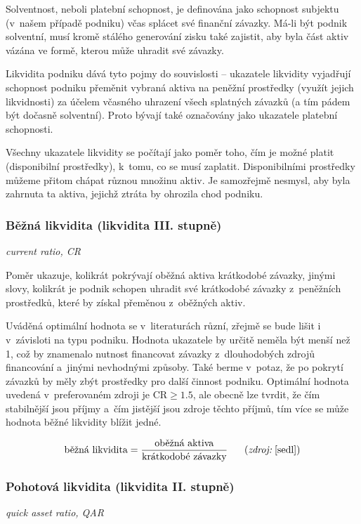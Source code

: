 Solventnost, neboli platební schopnost, je definována jako schopnost subjektu (v~našem případě podniku) včas splácet své finanční závazky. Má-li být podnik solventní, musí kromě stálého generování zisku také zajistit, aby byla část aktiv vázána ve formě, kterou může uhradit své závazky.

Likvidita podniku dává tyto pojmy do souvislosti -- ukazatele likvidity vyjadřují schopnost podniku přeměnit vybraná aktiva na peněžní prostředky (využít jejich likvidnosti) za účelem včasného uhrazení všech splatných závazků (a tím pádem být dočasně solventní).\cite{schol} Proto bývají také označovány jako ukazatele platební schopnosti.

Všechny ukazatele likvidity se počítají jako poměr toho, čím je možné platit (disponibilní prostředky), k~tomu, co se musí zaplatit. Disponibilními prostředky můžeme přitom chápat různou množinu aktiv. Je samozřejmě nesmysl, aby byla zahrnuta ta aktiva, jejichž ztráta by ohrozila chod podniku.

\subsubsection{Běžná likvidita (likvidita III. stupně)} 
\textit{current ratio, CR}

Poměr ukazuje, kolikrát pokrývají oběžná aktiva krátkodobé závazky, jinými slovy, kolikrát je podnik schopen uhradit své krátkodobé závazky z~peněžních prostředků, které by získal přeměnou z~oběžných aktiv.

Uváděná optimální hodnota se v~literaturách různí, zřejmě se bude lišit i v~závisloti na typu podniku. Hodnota ukazatele by určitě neměla být menší než 1, což by znamenalo nutnost financovat závazky z~dlouhodobých zdrojů financování a~jinými nevhodnými způsoby. Také berme v~potaz, že po pokrytí závazků by měly zbýt prostředky pro další činnost podniku.
Optimální hodnota uvedená v~preferovaném zdroji je CR$\geq 1.5$, ale obecně lze tvrdit, že čím stabilnější jsou příjmy a~čím jistější jsou zdroje těchto příjmů, tím více se může hodnota běžné likvidity blížit jedné.\cite{businessvize_bez_likv}

$$\vz{běžná likvidita}{oběžná aktiva}{krátkodobé závazky} \scite{sedl}$$

\subsubsection{Pohotová likvidita (likvidita II. stupně)} 
\textit{quick asset ratio, QAR}

